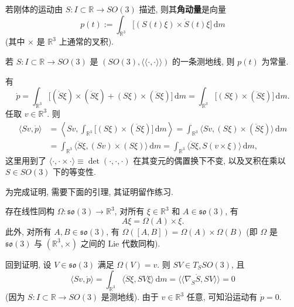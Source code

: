 \begin{RiemannDefinition}\label{def:angular-momentum-of-rigid-body}
若刚体的运动由 $S:I\subset\mathbb{R}\to SO(3)$ 描述, 则其\textbf{角动量}是向量
\[
  p(t):=\int_{\mathbb{R}^3}\bigl[(S(t)\xi)\times\dot S(t)\xi\bigr]\,\mathrm{d}m
\]
(其中 $\times$ 是 $\mathbb{R}^3$ 上通常的叉积).
\end{RiemannDefinition}

\begin{RiemannTheorem}\label{thm:conservation-of-angular-momentum-of-free-rigid-body}
若 $S:I\subset\mathbb{R}\to SO(3)$ 是 $(SO(3),\langle\!\langle\cdot,\cdot\rangle\!\rangle)$ 的一条测地线, 则 $p(t)$ 为常量.
\end{RiemannTheorem}

\begin{RiemannProof}
有
\[
  \dot p=\int_{\mathbb{R}^3}\bigl[(\dot S\xi)\times(\dot S\xi)+(S\xi)\times(\ddot S\xi)\bigr]\,\mathrm{d}m
        =\int_{\mathbb{R}^3}\bigl[(S\xi)\times(\ddot S\xi)\bigr]\,\mathrm{d}m.
\]
任取 $v\in\mathbb{R}^3$. 则
\begin{align*}
  \langle Sv,\dot p\rangle
  &=\left\langle Sv,\int_{\mathbb{R}^3}\bigl[(S\xi)\times(\ddot S\xi)\bigr]\,\mathrm{d}m\right\rangle
    =\int_{\mathbb{R}^3}\langle Sv,(S\xi)\times(\ddot S\xi)\rangle\,\mathrm{d}m\\
  &=\int_{\mathbb{R}^3}\langle\ddot S\xi,(Sv)\times(S\xi)\rangle\,\mathrm{d}m
    =\int_{\mathbb{R}^3}\langle\ddot S\xi,S(v\times\xi)\rangle\,\mathrm{d}m,
\end{align*}
这里用到了 $\langle\cdot,\cdot\times\cdot\rangle\equiv\det(\cdot,\cdot,\cdot)$ 在其变元的偶置换下不变, 以及叉积在乘以 $S\in SO(3)$ 下的等变性.

为完成证明, 需要下面的引理, 其证明留作练习.

\begin{RiemannLemma}\label{lem:so-three-cross-product-isomorphism}
存在线性同构 $\Omega:\mathfrak{so}(3)\to\mathbb{R}^3$, 对所有 $\xi\in\mathbb{R}^3$ 和 $A\in\mathfrak{so}(3)$, 有
\[
  A\xi=\Omega(A)\times\xi.
\]
此外, 对所有 $A,B\in\mathfrak{so}(3)$, 有 $\Omega([A,B])=\Omega(A)\times\Omega(B)$ (即 $\Omega$ 是 $\mathfrak{so}(3)$ 与 $(\mathbb{R}^3,\times)$ 之间的 Lie 代数同构).\hfill\openbox
\end{RiemannLemma}

回到证明, 设 $V\in\mathfrak{so}(3)$ 满足 $\Omega(V)=v$. 则 $SV\in T_SSO(3)$, 且
\[
  \langle Sv,\dot p\rangle
  =\int_{\mathbb{R}^3}\langle\ddot S\xi,SV\xi\rangle\,\mathrm{d}m
  =\langle\!\langle\nabla_{\dot S}\dot S,SV\rangle\!\rangle=0
\]
(因为 $S:I\subset\mathbb{R}\to SO(3)$ 是测地线). 由于 $v\in\mathbb{R}^3$ 任意, 可知沿运动有 $\dot p=0$.
\end{RiemannProof}

